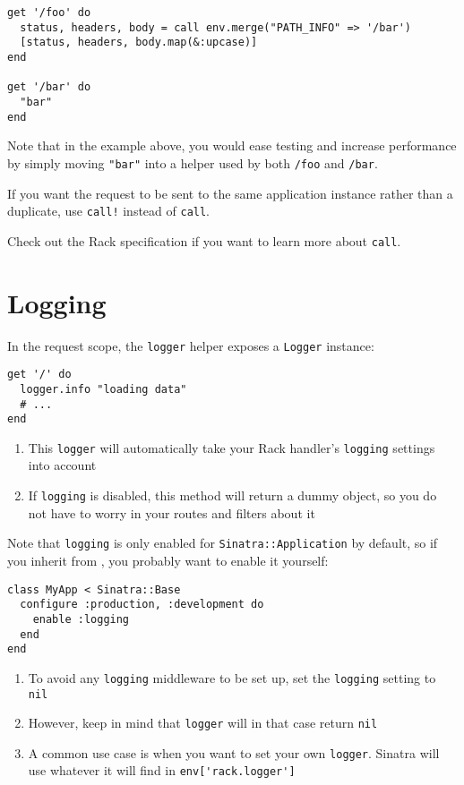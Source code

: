 \begin{verbatim}
get '/foo' do
  status, headers, body = call env.merge("PATH_INFO" => '/bar')
  [status, headers, body.map(&:upcase)]
end

get '/bar' do
  "bar"
end
\end{verbatim}

Note that in the example above, you would ease testing and increase performance by simply moving \verb|"bar"| into a helper used by both \verb|/foo| and \verb|/bar|.

If you want the request to be sent to the same application instance rather than a duplicate, use \verb|call!| instead of \verb|call|.

Check out the Rack specification if you want to learn more about \verb|call|.

\section{Logging}
In the request scope, the \verb|logger| helper exposes a \verb|Logger| instance:

\begin{verbatim}
get '/' do
  logger.info "loading data"
  # ...
end
\end{verbatim}
\begin{enumerate}
\item 
This \verb|logger| will automatically take your Rack handler’s \verb|logging| settings into account
\item  If \verb|logging| is disabled, this method will return a dummy object, so you do not have to worry in your routes and filters about it
\end{enumerate}

Note that \verb|logging| is only enabled for \verb|Sinatra::Application|
 by default, so if you inherit from \sinatrabase{}, you probably want to enable it yourself:

\begin{verbatim}
class MyApp < Sinatra::Base
  configure :production, :development do
    enable :logging
  end
end
\end{verbatim}
\begin{enumerate}
\item 
To avoid any \verb|logging| middleware to be set up, set the \verb|logging| setting to \verb|nil|
\item  However, keep in mind that \verb|logger| will in that case return \verb|nil|
\item  A common use case is when you want to set your own \verb|logger|.
Sinatra will use whatever it will find in \verb|env['rack.logger']|
\end{enumerate}

